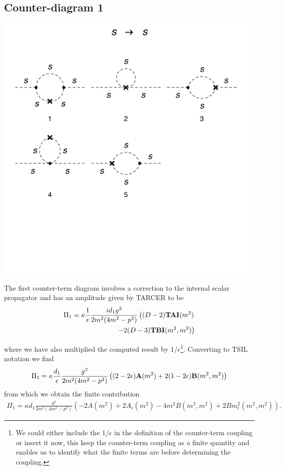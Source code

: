\documentclass[11pt]{article}
\newcommand{\tsil}{\textsf{TSIL} }
\newcommand{\tarcer}{\textsf{TARCER} }
\begin{document}
 \subsection*{Counter-diagram 1}
 \noindent\begin{minipage}{0.3\textwidth}
\begin{center}
\includegraphics{2loop_1c.pdf}
\end{center}
\end{minipage}
\noindent\begin{minipage}{0.7\textwidth}
The first counter-term diagram involves a correction to the internal scalar propagator and has an amplitude given by \tarcer to be
 \begin{align}
 \begin{split}
 \Pi_1 = \kappa\frac{ 1 }{\epsilon} \frac{i  d_1 g^2}{ 2 m^2 (4m^2-p^2)} \left( (D-2){\tt{\mathbf{TAI}}}(m^2)\right.&\\
 \left.-2(D-3){\tt{\mathbf{TBI}}}(m^2,m^2) \right)&
 \end{split}
 \end{align}
  \end{minipage}
where we have also multiplied the computed result by $1/\epsilon$\footnote{We could either include the $1/\epsilon$ in the definition of the counter-term coupling or insert it now, this keep the counter-term coupling as a finite quantity and enables us to identify what the finite terms are before determining the coupling.}.  Converting to \tsil notation we find
  \begin{align}
 \Pi_1 = \kappa \frac{ d_1 }{\epsilon}\frac{g^2}{ 2 m^2 (4m^2-p^2)} \left( (2-2\epsilon){\tt{\mathbf{A}}}(m^2)+2(1-2\epsilon){\tt{\mathbf{B}}}(m^2,m^2) \right)  
 \end{align}
 from which we obtain the finite contribution
 \begin{align}
 \Pi_1 = \kappa d_1 \frac{g^2}{ 2 m^2 (4m^2-p^2)} \left( -2 A(m^2)+2A_{\epsilon}(m^2)-4m^2B(m^2,m^2)+2Bm^2_{\epsilon}(m^2,m^2)\right).
 \end{align}
 
\end{document}

